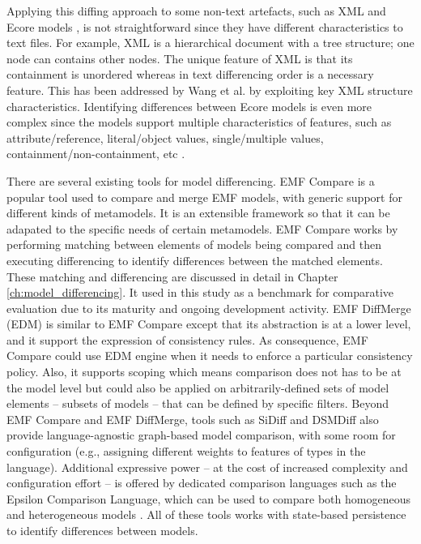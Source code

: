 Applying this diffing approach to some non-text artefacts, such as XML \cite{w3c-xml} and Ecore models \cite{steinberg2008emf}, is not straightforward since they have different characteristics to text files. For example, XML is a hierarchical document with a tree structure; one node can contains other nodes. The unique feature of XML is that its containment is  unordered whereas in text differencing order is a necessary feature. This has been addressed by Wang et al. \cite{wang2003xdiff} by exploiting key XML  structure characteristics. Identifying differences between Ecore models is even more complex since the models support multiple characteristics of features, such as attribute/reference, literal/object values, single/multiple values, containment/non-containment, etc \cite{steinberg2008emf}. 

There are several existing tools for model differencing. 
EMF Compare \cite{emfcompare2018developer} is a popular tool used to compare and merge EMF models, with generic support for different kinds of metamodels. It is an extensible framework so that it can be adapated to the specific needs of certain metamodels. EMF Compare works by performing matching between elements of models being compared and then executing differencing to identify differences between the matched elements. These matching and differencing are discussed in detail in Chapter \ref{ch:model_differencing}. It used in this study as a benchmark for comparative evaluation due to its maturity and ongoing development activity. EMF DiffMerge (EDM) \cite{eclipse2019emfdiffmerge} is similar to EMF Compare except that its abstraction is at a lower level, and it support the expression of consistency rules. As consequence, EMF Compare could use EDM engine when it needs to enforce a particular consistency policy. Also, it supports scoping which means comparison does not has to be at the model level but could also be applied on arbitrarily-defined sets of model elements -- subsets of models -- that can be defined by specific filters. Beyond EMF Compare and EMF DiffMerge, tools such as SiDiff \cite{Treude2007SiDiff} and DSMDiff \cite{lin2009dsmdiff} also provide language-agnostic graph-based model comparison, with some room for configuration (e.g., assigning different weights to features of types in the language). Additional expressive power -- at the cost of increased complexity and configuration effort -- is offered by dedicated comparison languages such as the Epsilon Comparison Language, which can be used to compare both homogeneous and heterogeneous models \cite{kolovos2009ecl}. All of these tools works with state-based persistence to identify differences between models.

